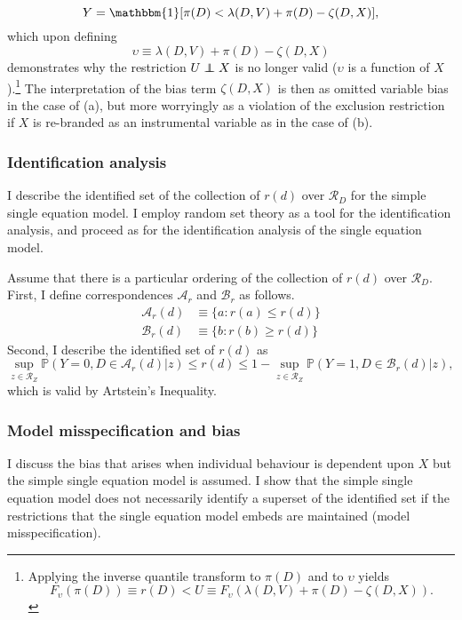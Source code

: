 \documentclass[12pt,a4paper,twoside]{article}
\newcommand\independent{\protect\mathpalette{\protect\independenT}{\perp}}
\def\independenT#1#2{\mathrel{\rlap{$#1#2$}\mkern2mu{#1#2}}}
\numberwithin{equation}{section}
\newcommand{\Art}{Artstein's Inequality}
\begin{document}
\[Y=\mathbbm{1}[\pi(D)<\lambda(D,V)+\pi(D)-\zeta(D,X)],\]
which upon defining 
\[\upsilon\equiv\lambda(D,V)+\pi(D)-\zeta(D,X)\]
demonstrates why the restriction $U\independent X$ is no longer valid ($\upsilon$ is a function of $X$).\footnote{Applying the inverse quantile transform to $\pi(D)$ and to $\upsilon$ yields
\[F_\upsilon(\pi(D))\equiv r(D)<U\equiv F_\upsilon(\lambda(D,V)+\pi(D)-\zeta(D,X)).\]} The interpretation of the bias term $\zeta(D,X)$ is then as omitted variable bias in the case of (a), but more worryingly as a violation of the exclusion restriction if $X$ is re-branded as an instrumental variable as in the case of (b). 
\subsubsection{Identification analysis}
I describe the identified set of the collection of $r(d)$ over $\mathcal{R}_D$ for the simple single equation model. I employ random set theory as a tool for the identification analysis, and proceed as for the identification analysis of the single equation model. 

Assume that there is a particular ordering of the collection of $r(d)$ over $\mathcal{R}_D$. First, I define correspondences $\mathcal{A}_r$ and $\mathcal{B}_r$ as follows.
\begin{align*}
\mathcal{A}_r(d)&\equiv\lbrace a : r(a)\leq r(d)\rbrace\\
\mathcal{B}_r(d)&\equiv\lbrace b : r(b)\geq r(d)\rbrace
\end{align*}
Second, I describe the identified set of $r(d)$ as
\begin{equation}
\sup_{z\in\mathcal{R}_Z}\mathbb{P}(Y=0,D\in\mathcal{A}_r(d)|z)\leq r(d)\leq 1-\sup_{z\in\mathcal{R}_Z}\mathbb{P}(Y=1,D\in\mathcal{B}_r(d)|z),\label{eq:rident}
\end{equation}
which is valid by {\Art}.
\subsubsection{Model misspecification and bias}
I discuss the bias that arises when individual behaviour is dependent upon $X$ but the simple single equation model is assumed. I show that the simple single equation model does not necessarily identify a superset of the identified set if the restrictions that the single equation model embeds are maintained (model misspecification).
\end{document}
